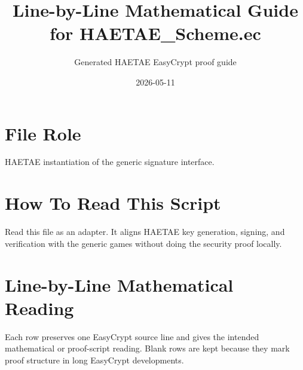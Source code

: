 \documentclass[10pt]{article}
\title{Line-by-Line Mathematical Guide for HAETAE\_Scheme.ec}
\author{Generated HAETAE EasyCrypt proof guide}
\date{2026-05-11}
\begin{document}
\maketitle

\section*{File Role}
HAETAE instantiation of the generic signature interface.

\section*{How To Read This Script}
Read this file as an adapter.  It aligns HAETAE key generation, signing, and verification with the generic games without doing the security proof locally.

\section*{Line-by-Line Mathematical Reading}
Each row preserves one EasyCrypt source line and gives the intended mathematical
or proof-script reading.  Blank rows are kept because they mark proof structure
in long EasyCrypt developments.
\end{document}
